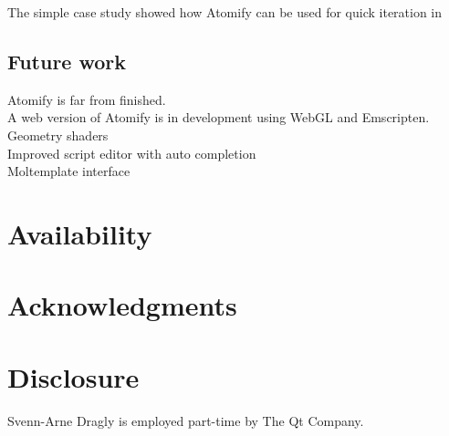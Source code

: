 \documentclass[aps,pre,twocolumn,letterpaper,floatfix,nofootinbib]{revtex4}
\begin{document}
The simple case study showed how Atomify can be used for quick iteration in 

\subsection{Future work}
Atomify is far from finished.\\
A web version of Atomify is in development using WebGL and Emscripten. \\
Geometry shaders \\
Improved script editor with auto completion \\
Moltemplate interface \\

\section{Availability}

\section{Acknowledgments}

\section{Disclosure}

Svenn-Arne Dragly is employed part-time by The Qt Company.


\end{document}
